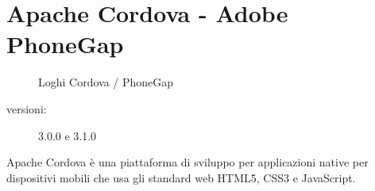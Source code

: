 \section{Apache Cordova - Adobe PhoneGap}
\begin{figure}[htb]
\centering
{} \quad
{}
\caption{Loghi Cordova / PhoneGap}
\label{fig:cordova phonegap}
\end{figure}

\begin{description}
\item[versioni:] 3.0.0 e 3.1.0
\end{description}

Apache Cordova è una piattaforma di sviluppo per applicazioni native per dispositivi mobili che usa gli standard web \acs{HTML5}, \acs{CSS3} e JavaScript.

